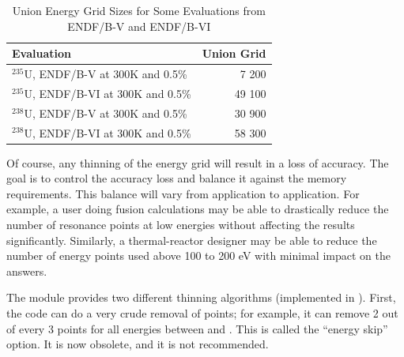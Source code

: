 \begin{table}[b]
\setlength{\extrarowheight}{1pt}
\caption[Example of union grid size variation in ACER .c files]{Union
 Energy Grid Sizes for Some Evaluations from ENDF/B-V and ENDF/B-VI}
\label{points}
\begin{center}
\begin{tabular}{lr}
Evaluation & Union Grid \\
\hline
$^{235}$U, ENDF/B-V at 300K and 0.5\% &  7 200 \\
$^{235}$U, ENDF/B-VI at 300K and 0.5\% & 49 100 \\
$^{238}$U, ENDF/B-V at 300K and 0.5\% &  30 900 \\
$^{238}$U, ENDF/B-VI at 300K and 0.5\% & 58 300 \\
\hline
\end{tabular}
\end{center}
\end{table}

Of course, any thinning of the energy grid will result in a loss of
accuracy.  The goal is to control the accuracy loss and balance it
against the memory requirements.  This balance will vary from
application to application.  For example, a user doing fusion
calculations may be able to drastically reduce the number of
resonance points at low energies without affecting the results
significantly.  Similarly, a thermal-reactor designer may be able
to reduce the number of energy points used above 100 to 200 eV with
minimal impact on the answers.

The  module provides two different
thinning algorithms (implemented in ).
First, the code can do a very crude removal of points;
for example, it can remove 2 out of every 3 points for all energies
between  and .  This is called the ``energy skip''
option.   It is now obsolete, and it is not recommended.

